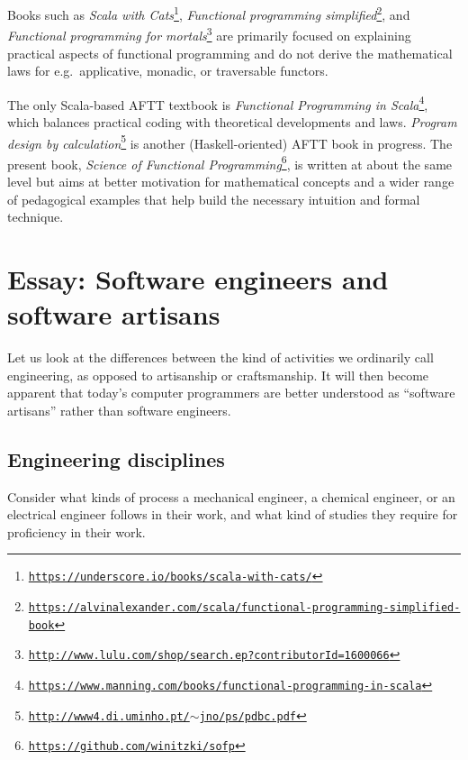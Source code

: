 Books such as \emph{Scala with Cats}\footnote{\texttt{\href{https://underscore.io/books/scala-with-cats/}{https://underscore.io/books/scala-with-cats/}}},
\emph{Functional programming simplified}\footnote{\texttt{\href{https://alvinalexander.com/scala/functional-programming-simplified-book}{https://alvinalexander.com/scala/functional-programming-simplified-book}}},
and \emph{Functional programming for mortals}\footnote{\texttt{\href{http://www.lulu.com/shop/search.ep?contributorId=1600066}{http://www.lulu.com/shop/search.ep?contributorId=1600066}}}
are primarily focused on explaining practical aspects of functional
programming and do not derive the mathematical laws for e.g.~applicative,
monadic, or traversable functors.

The only Scala-based AFTT textbook is \emph{Functional Programming
in Scala}\footnote{\texttt{\href{https://www.manning.com/books/functional-programming-in-scala}{https://www.manning.com/books/functional-programming-in-scala}}},
which balances practical coding with theoretical developments and
laws. \emph{Program design by calculation}\footnote{\texttt{\href{http://www4.di.uminho.pt/~jno/ps/pdbc.pdf}{http://www4.di.uminho.pt/$\sim$jno/ps/pdbc.pdf}}}
is another (Haskell-oriented) AFTT book in progress. The present book,
\emph{Science of Functional Programming}\footnote{\texttt{\href{https://github.com/winitzki/sofp}{https://github.com/winitzki/sofp}}},
is written at about the same level but aims at better motivation for
mathematical concepts and a wider range of pedagogical examples that
help build the necessary intuition and formal technique. 

\chapter{Essay: Software engineers and software artisans}

Let us look at the differences between the kind of activities we ordinarily
call engineering, as opposed to artisanship or craftsmanship. It will
then become apparent that today\textsf{'}s computer programmers are better
understood as \textsf{``}software artisans\textsf{''} rather than software engineers.

\section{Engineering disciplines }

Consider what kinds of process a mechanical engineer, a chemical engineer,
or an electrical engineer follows in their work, and what kind of
studies they require for proficiency in their work.

